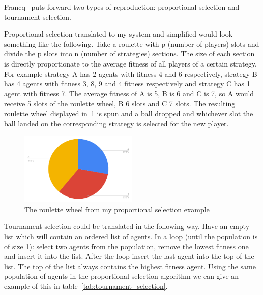 \documentclass[]{final_report}
\begin{document}
Francq~\cite{genetic_algorithms} puts forward two types of reproduction: proportional selection and tournament selection.\par
Proportional selection translated to my system and simplified would look something like the following. Take a roulette with p (number of players) slots and divide the p slots into n (number of strategies) sections. The size of each section is directly proportionate to the average fitness of all players of a certain strategy. For example strategy A has 2 agents with fitness 4 and 6 respectively, strategy B has 4 agents with fitness 3, 8, 9 and 4 fitness respectively and strategy C has 1 agent with fitness 7. The average fitness of A is 5, B is 6 and C is 7, so A would receive 5 slots of the roulette wheel, B 6 slots and C 7 slots. The resulting roulette wheel displayed in~\ref{fig:roulette_wheel} is spun and a ball dropped and whichever slot the ball landed on the corresponding strategy is selected for the new player.\par
\begin{figure}
	\begin{center}
	\includegraphics[width=0.5\textwidth]{reproduction_chart.png}
	\caption{The roulette wheel from my proportional selection example}
	\label{fig:roulette_wheel}
	\end{center}
\end{figure}
Tournament selection could be translated in the following way. Have an empty list which will contain an ordered list of agents. In a loop (until the population is of size 1): select two agents from the population, remove the lowest fitness one and insert it into the list. After the loop insert the last agent into the top of the list. The top of the list always contains the highest fitness agent. Using the same population of agents in the proportional selection algorithm we can give an example of this in table~\ref{tab:tournament_selection}.
\end{document}
